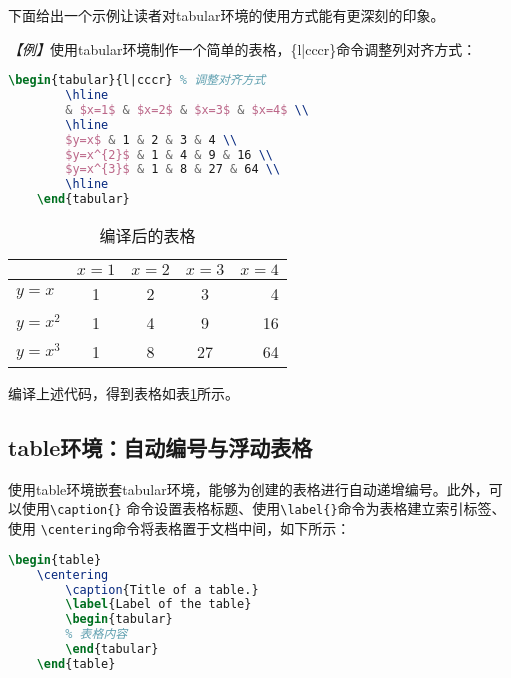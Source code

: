 下面给出一个示例让读者对tabular环境的使用方式能有更深刻的印象。

\emph{【例】}使用tabular环境制作一个简单的表格，\{l|cccr\}命令调整列对齐方式：
\begin{lstlisting}[language=TeX]
    \begin{tabular}{l|cccr} % 调整对齐方式
        \hline
        & $x=1$ & $x=2$ & $x=3$ & $x=4$ \\
        \hline
        $y=x$ & 1 & 2 & 3 & 4 \\
        $y=x^{2}$ & 1 & 4 & 9 & 16 \\
        $y=x^{3}$ & 1 & 8 & 27 & 64 \\
        \hline
    \end{tabular}
\end{lstlisting}

\begin{table}
    \centering
    \begin{tabular}{l|cccr} %
        \hline
                  & $x=1$ & $x=2$ & $x=3$ & $x=4$ \\
        \hline
        $y=x$     & 1     & 2     & 3     & 4     \\
        $y=x^{2}$ & 1     & 4     & 9     & 16    \\
        $y=x^{3}$ & 1     & 8     & 27    & 64    \\
        \hline
    \end{tabular}
    \caption{编译后的表格}
    \label{tb1}
\end{table}
编译上述代码，得到表格如表\ref{tb1}所示。

\subsection{table环境：自动编号与浮动表格}
使用table环境嵌套tabular环境，能够为创建的表格进行自动递增编号。此外，可以使用\texttt{\textbackslash{}caption\{\}}
命令设置表格标题、使用\texttt{\textbackslash{}label\{\}}命令为表格建立索引标签、使用
\texttt{\textbackslash{}centering}命令将表格置于文档中间，如下所示：
\begin{lstlisting}[language=TeX]
    \begin{table}
    \centering
        \caption{Title of a table.}
        \label{Label of the table}
        \begin{tabular}
        % 表格内容
        \end{tabular}
    \end{table}
\end{lstlisting}

